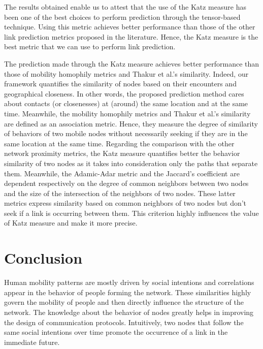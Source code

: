 \documentclass[conference]{IEEEtran}
\begin{document}
The results obtained enable us to attest that the use of the Katz
measure has been one of the best choices to perform prediction
through the tensor-based technique. Using this metric achieves
better performance than those of the other link prediction metrics
proposed in the literature. Hence, the Katz measure is the best
metric that we can use to perform link prediction.

The prediction made through the Katz measure achieves better
performance than those of mobility homophily metrics and Thakur et
al.'s similarity. Indeed, our framework quantifies the similarity of
nodes based on their encounters and geographical closeness. In other
words, the proposed prediction method cares about contacts (or
closenesses) at (around) the same location and at the same time.
Meanwhile, the mobility homophily metrics and Thakur et al.'s
similarity are defined as an association metric. Hence, they measure
the degree of similarity of behaviors of two mobile nodes without
necessarily seeking if they are in the same location at the same
time. Regarding the comparison with the other network proximity
metrics, the Katz measure quantifies better the behavior similarity
of two nodes as it takes into consideration only the paths that
separate them. Meanwhile, the Adamic-Adar metric and the Jaccard's
coefficient are dependent respectively on the degree of common
neighbors between two nodes and the size of the intersection of the
neighbors of two nodes. These latter metrics express similarity
based on common neighbors of two nodes but don't seek if a link is
occurring between them. This criterion highly influences the value
of Katz measure and make it more precise.

\section{Conclusion}
Human mobility patterns are mostly driven by social intentions and
correlations appear in the behavior of people forming the network.
These similarities highly govern the mobility of people and then
directly influence the structure of the network. The knowledge about
the behavior of nodes greatly helps in improving the design of
communication protocols. Intuitively, two nodes that follow the same
social intentions over time promote the occurrence of a link in the
immediate future.
\end{document}
